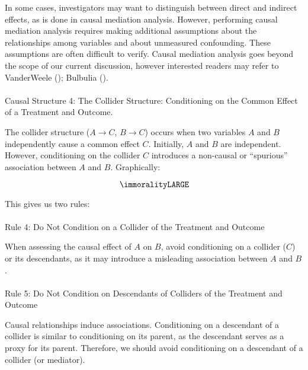 \documentclass[
  singlecolumn]{article}
\makeatletter
\let\oldparagraph\paragraph
\renewcommand{\paragraph}{
    \@ifstar
      \xxxParagraphStar
      \xxxParagraphNoStar
  }
\newcommand{\xxxParagraphStar}[1]{\oldparagraph*{#1}\mbox{}}
\newcommand{\xxxParagraphNoStar}[1]{\oldparagraph{#1}\mbox{}}
\makeatother
\begin{document}
In some cases, investigators may want to distinguish between direct and
indirect effects, as is done in causal mediation analysis. However,
performing causal mediation analysis requires making additional
assumptions about the relationships among variables and about unmeasured
confounding. These assumptions are often difficult to verify. Causal
mediation analysis goes beyond the scope of our current discussion,
however interested readers may refer to VanderWeele
(); Bulbulia
().

\paragraph{Causal Structure 4: The Collider Structure: Conditioning on
the Common Effect of a Treatment and
Outcome.}\label{causal-structure-4-the-collider-structure-conditioning-on-the-common-effect-of-a-treatment-and-outcome.}

The collider structure (\(A \to C\), \(B \to C\)) occurs when two
variables \(A\) and \(B\) independently cause a common effect \(C\).
Initially, \(A\) and \(B\) are independent. However, conditioning on the
collider \(C\) introduces a non-causal or ``spurious'' association
between \(A\) and \(B\). Graphically:

\[
\immoralityLARGE
\]

This gives us two rules:

\paragraph{Rule 4: Do Not Condition on a Collider of the Treatment and
Outcome}\label{rule-4-do-not-condition-on-a-collider-of-the-treatment-and-outcome}

When assessing the causal effect of \(A\) on \(B\), avoid conditioning
on a collider (\(C\)) or its descendants, as it may introduce a
misleading association between \(A\) and \(B\).

\paragraph{Rule 5: Do Not Condition on Descendants of Colliders of the
Treatment and
Outcome}\label{rule-5-do-not-condition-on-descendants-of-colliders-of-the-treatment-and-outcome}

Causal relationships induce associations. Conditioning on a descendant
of a collider is similar to conditioning on its parent, as the
descendant serves as a proxy for its parent. Therefore, we should avoid
conditioning on a descendant of a collider (or mediator).
\end{document}
